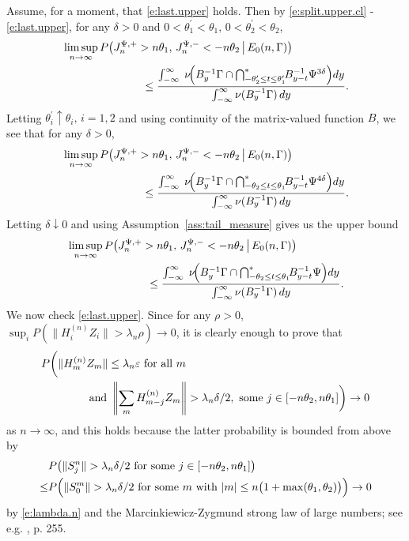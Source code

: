 \documentclass[11pt,reqno]{amsart}
\numberwithin{equation}{section}
\theoremstyle{definition}
\theoremstyle{remark}
\theoremstyle{definition}
\newcommand{\eps}{\varepsilon}
\begin{document}
Assume, for a moment, that \eqref{e:last.upper} holds. Then  by
\eqref{e:split.upper.cl} - \eqref{e:last.upper}, for any $\delta>0$
and $   0<\theta_1^\prime<\theta_1, \,
0<\theta_2^\prime<\theta_2$, 
\begin{align*}
&\limsup_{n\to\infty} P\big(J_n^{\Psi,+} > n\theta_1,\, J_n^{\Psi,-} <
-n\theta_2 \,\big|\, E_0(n,\Gamma)\big) \\
&\hskip 1in\leq \frac{\int_{-\infty}^\infty  \;
        \nu\!\Big(B_y^{-1} \Gamma \cap \bigcap^*_{-\theta_2^\prime\le t \le \theta_1^\prime} \!\!  B_{y-t}^{-1}\Psi^{3\delta}\Big) dy}
        {\int_{-\infty}^\infty \nu(B_y^{-1} \Gamma) \,dy}.
\end{align*}
Letting $\theta_i^\prime \uparrow \theta_i, \, i=1,2$ and using
continuity of the matrix-valued function $B$, we see that for any
$\delta>0$, 
\begin{align*}
&\limsup_{n\to\infty} P\big(J_n^{\Psi,+} > n\theta_1,\, J_n^{\Psi,-} <
-n\theta_2 \,\big|\, E_0(n,\Gamma)\big) \\
&\hskip 1in \leq \frac{\int_{-\infty}^\infty  \;
        \nu\!\Big(B_y^{-1} \Gamma \cap \bigcap^*_{-\theta_2\le t \le \theta_1} \!\!  B_{y-t}^{-1}\Psi^{4\delta}\Big) dy}
        {\int_{-\infty}^\infty \nu(B_y^{-1} \Gamma) \,dy}.
\end{align*}
Letting $\delta\downarrow 0$ and using
Assumption~\ref{ass:tail_measure} gives us the upper bound  
\begin{align} \label{e:upper.th2}
&\limsup_{n\to\infty} P\big(J_n^{\Psi,+} > n\theta_1,\, J_n^{\Psi,-} <
-n\theta_2 \,\big|\, E_0(n,\Gamma)\big) \\
&\hskip 1in \leq \frac{\int_{-\infty}^\infty  \;
        \nu\!\Big(B_y^{-1} \Gamma \cap \bigcap^*_{-\theta_2\le t \le \theta_1} \!\!  B_{y-t}^{-1}\Psi\Big) dy}
        {\int_{-\infty}^\infty \nu(B_y^{-1} \Gamma) \,dy}. \notag 
      \end{align}
  We now check \eqref{e:last.upper}. Since for any $\rho  > 0$, $\sup_i P(\|H_i^{(n)} Z_i\| > \lambda_n \rho) \to 0$, it is clearly  enough to prove that
\begin{align*}      
&P\biggl( \| H_m^{(n)} Z_m\|\leq \lambda_n\eps
                                     \ \text{for all} \ m\\
 &\hskip 0.6in \text{and} \ 
\left\| \sum_{m} H_{m-j}^{(n)} Z_m\right\| >\lambda_n\delta/2, \ \text{some} \ j \in
[-n\theta_2,n\theta_1]\biggr) \to 0
\end{align*}
as $n\to\infty$, and this holds because the latter probability is bounded from above by
\begin{align*}
&P\bigl( \| S_j^n\|>\lambda_n\delta/2 \ \text{for some} \ j \in
[-n\theta_2,n\theta_1]\big) \\
\leq &P\Bigl( \| S_0^m\|>\lambda_n\delta/2 \ \text{for some} \ m \
  \text{with} \ |m|\leq n\bigl( 1+\max(\theta_1,\theta_2)\bigr)\Bigr)
  \to 0
\end{align*}
by \eqref{e:lambda.n} and the Marcinkiewicz-Zygmund strong law of
large numbers; see e.g. \cite{loeve:1977}, p. 255. 
\end{document}
